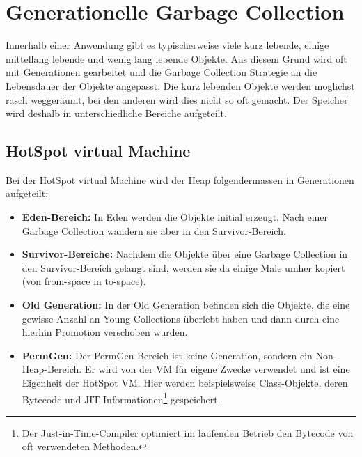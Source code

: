\section{Generationelle Garbage Collection}\label{generational gc}
Innerhalb einer Anwendung gibt es typischerweise viele kurz lebende, einige mittellang lebende und wenig lang lebende Objekte. Aus diesem Grund wird oft mit Generationen gearbeitet und die Garbage Collection Strategie an die Lebensdauer der Objekte angepasst. Die kurz lebenden Objekte werden möglichst rasch weggeräumt, bei den anderen wird dies nicht so oft gemacht. Der Speicher wird deshalb in unterschiedliche Bereiche aufgeteilt. 

\subsection{HotSpot virtual Machine}
Bei der HotSpot virtual Machine wird der Heap folgendermassen in Generationen aufgeteilt:

\begin{itemize}
	\item \textbf{Eden-Bereich:} In Eden werden die Objekte initial erzeugt. Nach einer Garbage Collection wandern sie aber in den Survivor-Bereich.
	\item \textbf{Survivor-Bereiche:} Nachdem die Objekte über eine Garbage Collection in den Survivor-Bereich gelangt sind, werden sie da einige Male umher kopiert (von from-space in to-space).
	\item \textbf{Old Generation:} In der Old Generation befinden sich die Objekte, die eine gewisse Anzahl an Young Collections überlebt haben und dann durch eine hierhin Promotion verschoben wurden.
	\item  \textbf{PermGen:} Der PermGen Bereich ist keine Generation, sondern ein Non-Heap-Bereich. Er wird von der VM für eigene Zwecke verwendet und ist eine Eigenheit der HotSpot VM. Hier werden beispielsweise Class-Objekte, deren Bytecode und JIT-Informationen\footnote{Der Just-in-Time-Compiler optimiert im laufenden Betrieb den Bytecode von oft verwendeten Methoden.} gespeichert.
\end{itemize}

